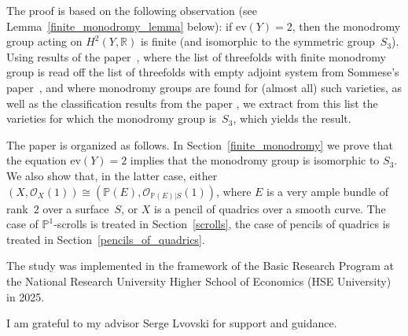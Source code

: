 \documentclass[a4paper]{amsart}
\theoremstyle{plain}
\theoremstyle{definition}
\begin{document}
The proof is based on the following observation (see Lemma~\ref{finite_monodromy_lemma}
below): if $\mathrm{ev}(Y)=2$, then the monodromy group acting on
$H^2(Y,\mathbb R)$ is finite (and isomorphic to the symmetric
group~$S_3$). Using results of the paper~\cite{Lvovski}, where the
list of threefolds with finite monodromy group is read off the list of
threefolds with empty adjoint system from Sommese's
paper~\cite{Sommese}, and where monodromy groups are found for (almost
all) such varieties, as well as the classification results from the
paper \cite{Takahashi},
we extract from this list the varieties for which the monodromy group
is~$S_3$, which yields the result.

The paper is organized as follows. In Section~\ref{finite_monodromy} we prove that
the equation $\mathrm{ev}(Y)=2$ implies that the monodromy group is
isomorphic to $S_3$. We also show that, in the latter
case, either $(X,\mathcal O_X(1))\cong (\mathbb P(E),\mathcal O_{\mathbb P(E)|S}(1))$,
where $E$ is a very ample bundle of rank~$2$ over a
surface~$S$, or $X$ is a pencil of quadrics over a smooth curve. The
case of $\mathbb P^1$-scrolls is treated in Section~\ref{scrolls}, the
case of pencils of quadrics is treated in Section~\ref{pencils_of_quadrics}.

The study was implemented in the framework of the Basic Research Program at the National Research University Higher School of Economics (HSE University) in 2025.

I am grateful to my advisor Serge Lvovski for support and
guidance.
\end{document}

